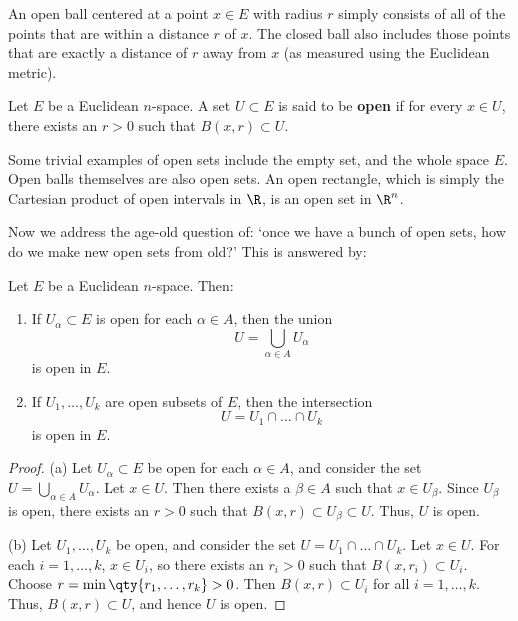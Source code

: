An open ball centered at a point \( x\in E \) with radius \( r \) simply consists of all of the points that are within a distance \( r \) of \( x \). The closed ball also includes those points that are exactly a distance of \( r \) away from \( x \) (as measured using the Euclidean metric).

\begin{definition}
  Let \( E \) be a Euclidean \( n \)-space. A set \( U\subset E \) is said to be \textbf{open} if for every \( x\in U \), there exists an \( r>0 \) such that \( B(x,r)\subset U \).
\end{definition}

Some trivial examples of open sets include the empty set, and the whole space \( E \). Open balls themselves are also open sets. An open rectangle, which is simply the Cartesian product of open intervals in \( \R \), is an open set in \( \R^n \).

\vspace{3mm}

Now we address the age-old question of: `once we have a bunch of open sets, how do we make new open sets from old?' This is answered by:

\begin{proposition}
  \label{thm:newopenfromold}
  Let \( E \) be a Euclidean \( n \)-space. Then:
  \begin{enumerate}[label=(\alph*)]
  \item If \( U_\alpha\subset E \) is open for each \( \alpha\in A \), then the union
    \[ U=\bigcup_{\alpha\in A}U_\alpha \]
    is open in \( E \).
  \item If \( U_1,\dots,U_k \) are open subsets of \( E \), then the intersection
    \[ U=U_1\cap \dots \cap U_k \]
    is open in \( E \).
  \end{enumerate}
\end{proposition}
\begin{proof}
  (a) Let \( U_\alpha\subset E \) be open for each \( \alpha\in A \), and consider the set \( U=\bigcup_{\alpha\in A}U_\alpha \). Let \( x\in U \). Then there exists a \( \beta\in A \) such that \( x\in U_\beta \). Since \( U_\beta \) is open, there exists an \( r>0 \) such that \( B(x,r)\subset U_\beta\subset U \). Thus, \( U \) is open.

  \vspace{3mm}

  (b) Let \( U_1,\dots,U_k \) be open, and consider the set \( U=U_1\cap\dots\cap U_k \). Let \( x\in U \). For each \( i=1,\dots,k \), \( x\in U_i \), so there exists an \( r_i>0 \) such that \( B(x,r_i)\subset U_i \). Choose \( r=\min\qty{r_1,\dots,r_k}>0 \). Then \( B(x,r)\subset U_i \) for all \( i=1,\dots, k \). Thus, \( B(x,r)\subset U \), and hence \( U \) is open.
\end{proof}

